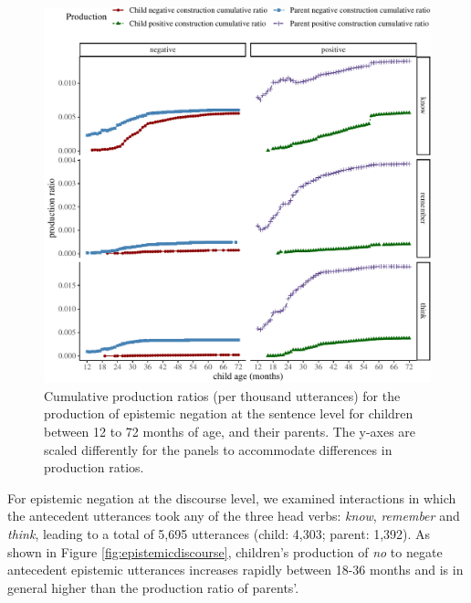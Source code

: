\documentclass[
  man,floatsintext]{apa6}
\begin{document}
\begin{figure}[H]

{\centering \includegraphics{neg_construction_article_files/figure-latex/epistemic-1} 

}

\caption{Cumulative production ratios (per thousand utterances) for the production of epistemic negation at the sentence level for children between 12 to 72 months of age, and their parents. The y-axes are scaled differently for the panels to accommodate differences in production ratios.}\label{fig:epistemic}
\end{figure}

For epistemic negation at the discourse level, we examined interactions in which the antecedent utterances took any of the three head verbs: \emph{know}, \emph{remember} and \emph{think}, leading to a total of 5,695 utterances (child: 4,303; parent: 1,392). As shown in Figure \ref{fig:epistemicdiscourse}, children's production of \emph{no} to negate antecedent epistemic utterances increases rapidly between 18-36 months and is in general higher than the production ratio of parents'.
\end{document}
